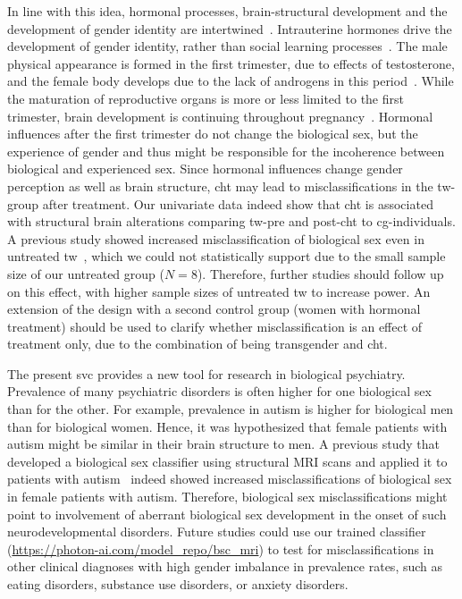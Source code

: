 \documentclass{article}
\begin{document}
    In line with this idea, hormonal processes, brain-structural development and the development of gender identity are intertwined~\cite{Nguyen2018a}. Intrauterine hormones drive the development of gender identity, rather than social learning processes~\cite{Bao2005, Swaab2009}. The male physical appearance is formed in the first trimester, due to effects of testosterone, and the female body develops due to the lack of androgens in this period~\cite{Shamim2000}. While the maturation of reproductive organs is more or less limited to the first trimester, brain development is continuing throughout pregnancy~\cite{Bao2011,VanGoozenS.H.Slabbekoorn2002}. Hormonal influences after the first trimester do not change the biological sex, but the experience of gender and thus might be responsible for the incoherence between biological and experienced sex. Since hormonal influences change gender perception as well as brain structure, \ac{cht} may lead to misclassifications in the \ac{tw}-group after treatment. Our univariate data indeed show that \ac{cht} is associated with structural brain alterations comparing \ac{tw}-pre and post-\ac{cht} to \ac{cg}-individuals. A previous study showed increased misclassification of biological sex even in untreated \ac{tw}~\cite{Hoekzema2015}, which we could not statistically support due to the small sample size of our untreated group ($N = 8$). Therefore, further studies should follow up on this effect, with higher sample sizes of untreated \ac{tw} to increase power. An extension of the design with a second control group (women with hormonal treatment) should be used to clarify whether misclassification is an effect of treatment only, due to the combination of being transgender and \ac{cht}.

    The present \ac{svc} provides a new tool for research in biological psychiatry. Prevalence of many psychiatric disorders is often higher for one biological sex than for the other. For example, prevalence in autism is higher for biological men than for biological women. Hence, it was hypothesized that female patients with autism might be similar in their brain structure to men. A previous study that developed a biological sex classifier using structural MRI scans and applied it to patients with autism~\cite{Ecker2017} indeed showed increased misclassifications of biological sex in female patients with autism. Therefore, biological sex misclassifications might point to involvement of aberrant biological sex development in the onset of such neurodevelopmental disorders. Future studies could use our trained classifier (\url{https://photon-ai.com/model_repo/bsc_mri}) to test for misclassifications in other clinical diagnoses with high gender imbalance in prevalence rates, such as eating disorders, substance use disorders, or anxiety disorders.
\end{document}
